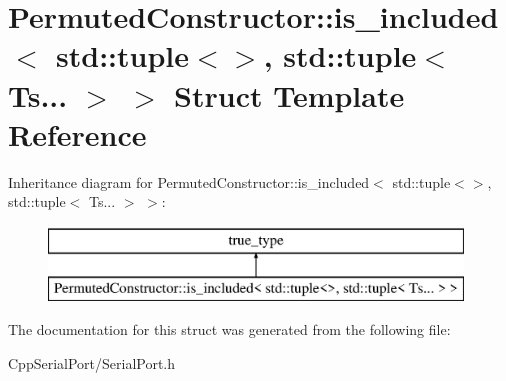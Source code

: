 \hypertarget{struct_permuted_constructor_1_1is__included_3_01std_1_1tuple_3_4_00_01std_1_1tuple_3_01_ts_8_8_8_01_4_01_4}{}\section{Permuted\+Constructor\+:\+:is\+\_\+included$<$ std\+:\+:tuple$<$$>$, std\+:\+:tuple$<$ Ts... $>$ $>$ Struct Template Reference}
\label{struct_permuted_constructor_1_1is__included_3_01std_1_1tuple_3_4_00_01std_1_1tuple_3_01_ts_8_8_8_01_4_01_4}
Inheritance diagram for Permuted\+Constructor\+:\+:is\+\_\+included$<$ std\+:\+:tuple$<$$>$, std\+:\+:tuple$<$ Ts... $>$ $>$\+:\begin{figure}[H]
\begin{center}
\leavevmode
\includegraphics[height=2.000000cm]{struct_permuted_constructor_1_1is__included_3_01std_1_1tuple_3_4_00_01std_1_1tuple_3_01_ts_8_8_8_01_4_01_4}
\end{center}
\end{figure}


The documentation for this struct was generated from the following file\+:\begin{DoxyCompactItemize}
\item 
Cpp\+Serial\+Port/Serial\+Port.\+h\end{DoxyCompactItemize}
